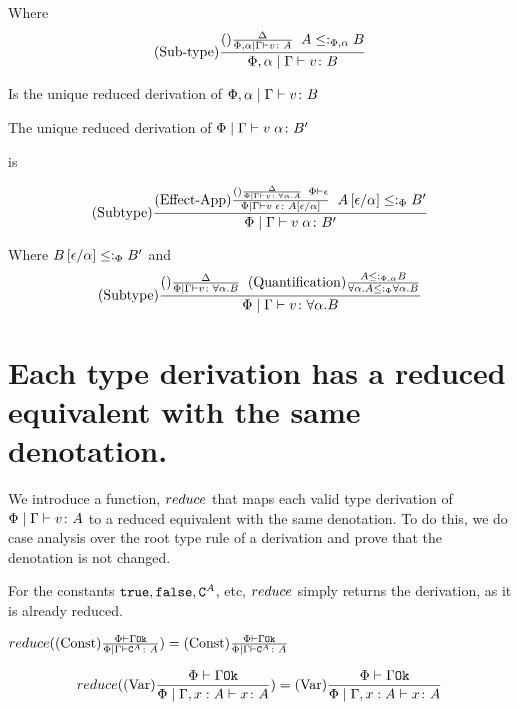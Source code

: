 {    Where
    \begin{eqnarray}
        (\text{Sub-type}) \frac{
            (\text{}) \frac{\Delta}{\Phi,\alpha\mid\Gamma \vdash v \colon A}
            \;\;
            A\leq:_{\Phi,\alpha}B
        }{
            \Phi,\alpha\mid\Gamma \vdash v \colon B
        }
    \end{eqnarray}

    Is the unique reduced derivation of $\Phi,\alpha\mid\Gamma \vdash v \colon B$

    The unique reduced derivation of $\Phi\mid\Gamma \vdash v\;\alpha \colon B'$

    is 

    \begin{equation}
        (\text{Subtype}) \frac{
            (\text{Effect-App}) \frac{
                (\text{}) \frac{\Delta}{\Phi\mid\Gamma \vdash v \colon \forall \alpha. A}\;\;\Phi\vdash \epsilon
            }{\Phi\mid\Gamma \vdash v\;\epsilon \colon A\left[\epsilon / \alpha\right]}
            \;\;            
            A\left[\epsilon / \alpha\right]\leq:_\Phi B'
        }{\Phi\mid\Gamma \vdash v\;\alpha \colon B'}
    \end{equation}

    Where $B\left[\epsilon / \alpha\right]\leq:_\Phi B'$
    and
    \begin{equation}
        (\text{Subtype}) \frac{
            (\text{}) \frac{\Delta}{\Phi\mid\Gamma \vdash v \colon \forall \alpha. B}\;\; (\text{Quantification}) \frac{A\leq:_{\Phi,\alpha}B}{\forall \alpha. A\leq:_\Phi\forall \alpha. B}
        }{\Phi\mid\Gamma \vdash v \colon \forall \alpha. B}
    \end{equation}

    \section{Each type derivation has a reduced equivalent with the same denotation.}
    We introduce a function, $reduce$ that maps each valid type derivation of $\Phi\mid\Gamma \vdash v \colon A$ to a reduced equivalent with the same denotation. To do this, we do case analysis over the root type rule of a derivation and prove that the denotation is not changed.

            For the constants $\texttt{true}, \texttt{false}, \texttt{C}^{A}$, etc, $reduce$ simply returns the derivation, as it is already reduced.

            $reduce((\text{Const}) \frac{\Phi\vdash \Gamma \texttt{Ok}}{\Phi\mid\Gamma \vdash \texttt{C}^{A} \colon A}) = (\text{Const}) \frac{\Phi\vdash \Gamma \texttt{Ok}}{\Phi\mid\Gamma \vdash \texttt{C}^{A} \colon A}$

   
            \begin{equation}
                reduce((\text{Var}) \frac{\Phi\vdash \Gamma \texttt{Ok}}{\Phi\mid\Gamma, x: A \vdash x \colon A}) =  (\text{Var}) \frac{\Phi\vdash \Gamma \texttt{Ok}}{\Phi\mid\Gamma, x: A \vdash x \colon A}
            \end{equation}

}
